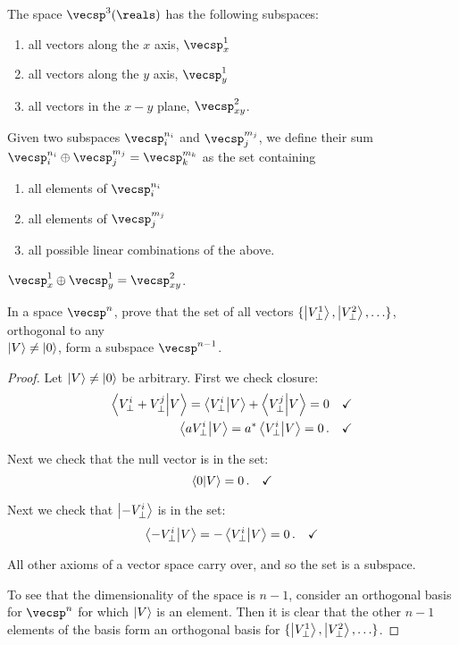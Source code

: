 \begin{example}
The space $\vecsp^3(\reals)$ has the following subspaces:
\begin{enumerate}
    \item all vectors along the $x$ axis, $\vecsp_x^{1}$
    \item all vectors along the $y$ axis, $\vecsp_y^{1}$
    \item all vectors in the $x-y$ plane, $\vecsp_{xy}^{2}$.
\end{enumerate}
\end{example}

\begin{shaded*}
Given two subspaces $\vecsp_i^{n_i}$ and $\vecsp_j^{m_j}$, we define their sum $\vecsp_i^{n_i} \oplus \vecsp_j^{m_j} = \vecsp_k^{m_k}$ as the set containing
\begin{enumerate}
    \item all elements of $\vecsp_i^{n_i}$
    \item all elements of $\vecsp_j^{m_j}$
    \item all possible linear combinations of the above.
\end{enumerate}
\end{shaded*}

\begin{example}
$\vecsp_x^{1} \oplus \vecsp_y^{1} = \vecsp_{xy}^{2}$.
\end{example}

\begin{exercise}
In a space $\vecsp^n$, prove that the set of all vectors $\{\ket{V_\perp^1}, \ket{V_\perp^2}, \ldots\}$, orthogonal to any \\$\ket{V} \neq \ket{0}$, form a subspace $\vecsp^{n - 1}$.
\end{exercise}

\begin{proof}
Let $\ket{V} \neq \ket{0}$ be arbitrary. First we check closure:
\begin{align}
    \braket{V_\perp^i + V_\perp^j}{V} = \braket{V_\perp^i}{V} + \braket{V_\perp^j}{V} = 0 \quad &\checkmark \\
    \braket{aV_\perp^i}{V} = a^*\braket{V_\perp^i}{V} = 0\,. \quad &\checkmark
\end{align}

Next we check that the null vector is in the set:
\begin{equation}
    \braket{0}{V} = 0\,. \quad \checkmark
\end{equation}

Next we check that $\ket{-V_\perp^i}$ is in the set:
\begin{equation}
    \braket{-V_\perp^i}{V} = -\braket{V_\perp^i}{V} = 0\,. \quad \checkmark
\end{equation}

All other axioms of a vector space carry over, and so the set is a subspace.

To see that the dimensionality of the space is $n - 1$, consider an orthogonal basis for $\vecsp^n$ for which $\ket{V}$ is an element. Then it is clear that the other $n - 1$ elements of the basis form an orthogonal basis for $\{\ket{V_\perp^1}, \ket{V_\perp^2}, \ldots\}$.
\end{proof}

